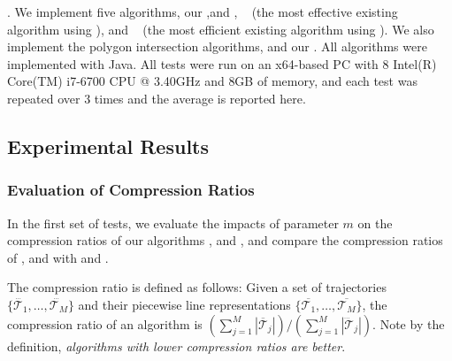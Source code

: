 
.
We implement five \lsa algorithms, \ie our \cist ,\cista and \cisto, \dps~\cite{Meratnia:Spatiotemporal} (the most effective existing \lsa algorithm using \sed), and \squishe~\cite{Muckell:Compression} (the most efficient existing \lsa algorithm using \sed).
We also implement the polygon intersection algorithms, \cpia and our \rpia.
All algorithms were implemented with Java.
All tests were run on an {x64-based  PC with 8 Intel(R) Core(TM) i7-6700 CPU @ 3.40GHz and 8GB of memory, and each test was repeated
over 3 times and the average is reported here}.
%

\subsection{Experimental Results}


\subsubsection{Evaluation of Compression Ratios}


In the first set of tests, we evaluate the impacts of parameter $m$ on the
compression ratios of our algorithms \cisto, \cist and \cista, and compare the compression ratios of \cisto, \cist and \cista with \dps and \squishe.

The compression ratio is defined as follows: Given a set of trajectories $\{\dddot{\mathcal{T}_1}, \ldots, \dddot{\mathcal{T}_M}\}$ and their piecewise line representations $\{\overline{\mathcal{T}_1}, \ldots, \overline{\mathcal{T}_M}\}$, the compression ratio of an algorithm is $(\sum_{j=1}^{M} |\overline{\mathcal{T}}_j |)/(\sum_{j=1}^{M} |\dddot{\mathcal{T}}_j |)$.
Note by the definition, \emph{algorithms with lower compression ratios are better}.





